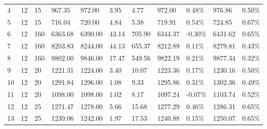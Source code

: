 \documentclass[../main]{subfiles}
\begin{document}
\begin{longtable}{l|ll|lll|lllll}
   4                   & 12                              & 15                     & 967.35              & 972.00   & 3.95          & 4.77                       & \cellcolor{green!25}972.00  & 0.48\%  & 976.86  & 0.50\% \\
   5                   & 12                              & 15                     & 716.04              & 720.00   & 4.84          & 5.38                       & \cellcolor{green!25}719.91  & 0.54\%  & 724.85  & 0.67\% \\
   6                   & 12                              & 160                    & 6363.68             & 6390.00  & 43.14         & 705.90                     & 6344.37                     & -0.30\% & 6431.62 & 0.65\% \\
   7                   & 12                              & 160                    & 8203.83             & 8244.00  & 44.13         & 655.37                     & \cellcolor{green!25}8212.89 & 0.11\%  & 8279.81 & 0.43\% \\
   8                   & 12                              & 160                    & 9802.00             & 9846.00  & 17.47         & 549.56                     & \cellcolor{green!25}9822.19 & 0.21\%  & 9877.34 & 0.32\% \\
   9                   & 12                              & 20                     & 1221.31             & 1224.00  & 3.40          & 10.07                      & \cellcolor{green!25}1223.36 & 0.17\%  & 1230.16 & 0.50\% \\
   10                  & 12                              & 20                     & 1291.84             & 1296.00  & 1.08          & 9.33                       & \cellcolor{green!25}1295.86 & 0.31\%  & 1302.36 & 0.49\% \\
   11                  & 12                              & 20                     & 1098.00             & 1098.00  & 1.02          & 8.17                       & 1097.24                     & -0.07\% & 1103.74 & 0.52\% \\
   12                  & 12                              & 25                     & 1271.47             & 1278.00  & 5.66          & 15.68                      & \cellcolor{green!25}1277.29 & 0.46\%  & 1286.31 & 0.65\% \\
   13                  & 12                              & 25                     & 1239.06             & 1242.00  & 1.97          & 17.53                      & \cellcolor{green!25}1240.88 & 0.15\%  & 1250.07 & 0.65\% \\

\end{longtable}
\end{document}
